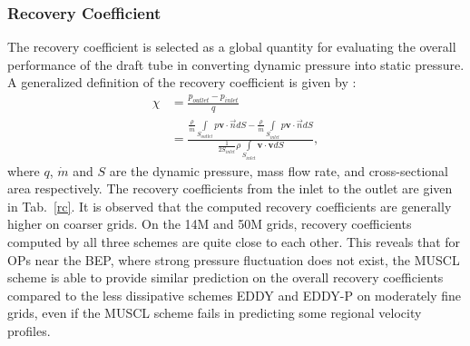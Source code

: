 \subsubsection{Recovery Coefficient}
The recovery coefficient is selected as a global quantity for evaluating the overall performance of the draft tube in converting dynamic pressure into static pressure. A generalized definition of the recovery coefficient is given by \cite{fox1971effects}: 
\begin{align} 
\chi&=\frac{p_{outlet}-p_{inlet}}{q}\\
&=\frac{\frac{\rho}{\dot{m}}\underset{S_{outlet}}{\int}p\mathbf{v}\cdot \vec{n}dS-\frac{\rho}{\dot{m}}\underset{S_{inlet}}{\int}p\mathbf{v}\cdot \vec{n}dS}{\frac{1}{2S_{inlet}}\rho\underset{S_{inlet}}{\int}\mathbf{v}\cdot\mathbf{v}dS}, 
\end{align}
where $q$, $\dot{m}$ and $S$ are the dynamic pressure, mass flow rate, and cross-sectional area respectively. The recovery coefficients from the inlet to the outlet are given in Tab.~\ref{rc}. It is observed that the computed recovery coefficients are generally higher on coarser grids. On the 14M and 50M grids, recovery coefficients computed by all three schemes are quite close to each other. This reveals that for OPs near the BEP, where strong pressure fluctuation does not exist, the MUSCL scheme is able to provide similar prediction on the overall recovery coefficients compared to the less dissipative schemes EDDY and EDDY-P on moderately fine grids, even if the MUSCL scheme fails in predicting some regional velocity profiles.
